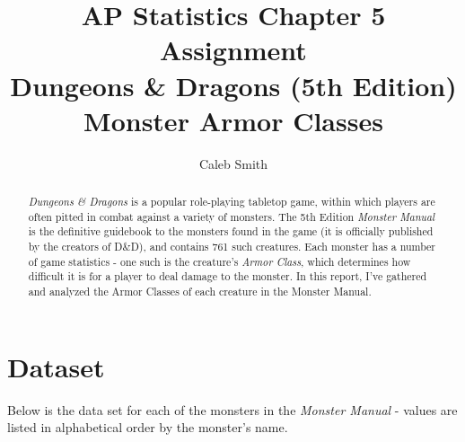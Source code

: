 \documentclass[a4paper]{article}
\title{AP Statistics Chapter 5 Assignment \\
		\large Dungeons \& Dragons (5th Edition) Monster Armor Classes}
\author{Caleb Smith}
\begin{document}
\maketitle

\begin{abstract}
\textit{Dungeons \& Dragons} is a popular role-playing tabletop game, within which players are often pitted in combat against a variety of monsters. The 5th Edition \textit{Monster Manual} is the definitive guidebook to the monsters found in the game (it is officially published by the creators of D\&D), and contains 761 such creatures. Each monster has a number of game statistics - one such is the creature's \textit{Armor Class}, which determines how difficult it is for a player to deal damage to the monster. In this report, I've gathered and analyzed the Armor Classes of each creature in the Monster Manual. 
\end{abstract}

\section{Dataset}

Below is the data set for each of the monsters in the \textit{Monster Manual} - values are listed in alphabetical order by the monster's name.
\end{document}
